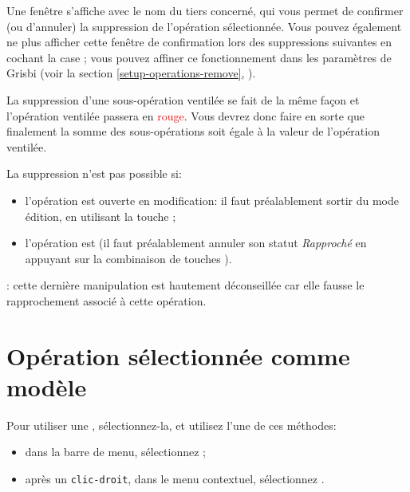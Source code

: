 Une fenêtre s'affiche avec le nom du tiers concerné, qui vous permet de confirmer (ou d'annuler) la suppression de l'opération sélectionnée. Vous pouvez également ne plus afficher cette fenêtre de confirmation lors des suppressions suivantes en cochant la case ; vous pouvez affiner ce fonctionnement dans les paramètres de Grisbi (voir la section \vref{setup-operations-remove}, ).

La suppression d'une sous-opération ventilée se fait de la même façon et l'opération ventilée passera en \textcolor{red}{rouge}. Vous devrez donc faire en sorte que finalement la somme des sous-opérations soit égale à la valeur de l'opération ventilée.

La suppression n'est pas possible si:
\begin{itemize}
	\item l'opération est ouverte en modification: il faut préalablement sortir du mode édition, en utilisant la touche ;
	\item l'opération est  (il faut préalablement annuler son statut \emph{Rapproché} en appuyant sur la combinaison de touches ).
\end{itemize}

\Attention{}: cette dernière manipulation est hautement déconseillée car elle fausse le rapprochement associé à cette opération.


\section{Opération sélectionnée comme modèle\label{transactions-model}}

Pour utiliser une , sélectionnez-la, et utilisez l'une de ces méthodes:
\begin{itemize}
	\item dans la barre de menu, sélectionnez ;
	\item après un \texttt{clic-droit}, dans le menu contextuel, sélectionnez .
\end{itemize}

